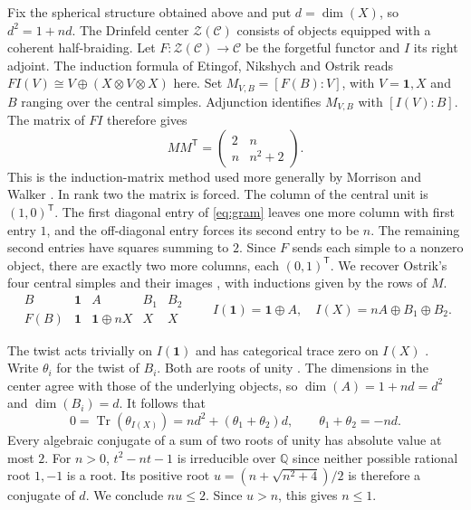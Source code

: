 \documentclass[11pt,a4paper]{article}
\newcommand{\Q}{\mathbb Q}
\newcommand{\one}{\mathbf 1}
\newcommand{\cC}{\mathcal C}
\newcommand{\cZ}{\mathcal Z}
\DeclareMathOperator{\Tr}{Tr}
\numberwithin{equation}{section}
\begin{document}
Fix the spherical structure obtained above and put $d=\dim(X)$, so
$d^2=1+nd$. The Drinfeld center $\cZ(\cC)$ consists of objects
equipped with a coherent half-braiding. Let $F:\cZ(\cC)\to\cC$ be
the forgetful functor and $I$ its right adjoint. The induction formula
of Etingof, Nikshych and Ostrik \cite[Proposition~5.4]{ENO} reads
$FI(V)\cong V\oplus(X\otimes V\otimes X)$ here. Set
$M_{V,B}=[F(B):V]$, with $V=\one,X$ and $B$ ranging over the
central simples. Adjunction identifies $M_{V,B}$ with $[I(V):B]$.
The matrix of $FI$ therefore gives
\begin{equation}\label{eq:gram}
 M M^{\mathsf T}=
 \begin{pmatrix}2&n\\ n&n^2+2\end{pmatrix}.
\end{equation}
This is the induction-matrix method used more generally by Morrison
and Walker \cite{MW}. In rank two the matrix is forced. The column of
the central unit is $(1,0)^{\mathsf T}$. The first diagonal entry of
\eqref{eq:gram} leaves one more column with first entry $1$, and the
off-diagonal entry forces its second entry to be $n$. The remaining
second entries have squares summing to $2$. Since $F$ sends each
simple to a nonzero object, there are exactly two more columns, each
$(0,1)^{\mathsf T}$. We recover Ostrik's four central simples and their images
\cite[Lemma~2.1]{OstrikRank2}, with inductions given by the rows of $M$.
\[
\begin{array}{c|cccc}
 B&\one&A&B_1&B_2\\ \hline
 F(B)&\one&\one\oplus nX&X&X
\end{array}
\qquad
 I(\one)=\one\oplus A,\quad I(X)=nA\oplus B_1\oplus B_2 .
\]

The twist acts trivially on $I(\one)$ and has categorical trace zero
on $I(X)$ \cite[Theorem~2.5]{OstrikRank3}. Write $\theta_i$ for the
twist of $B_i$. Both are roots of unity
\cite[Theorem~5.5]{NS}. The dimensions in the center agree with
those of the underlying objects, so $\dim(A)=1+nd=d^2$ and
$\dim(B_i)=d$. It follows that
\[
 0=\Tr(\theta_{I(X)})=nd^2+(\theta_1+\theta_2)d,\qquad
 \theta_1+\theta_2=-nd .
\]
Every algebraic conjugate of a sum of two roots of unity has
absolute value at most $2$. For $n>0$, $t^2-nt-1$ is irreducible
over $\Q$ since neither possible rational root $1,-1$ is a root.
Its positive root $u=(n+\sqrt{n^2+4})/2$ is therefore a conjugate of
$d$. We conclude $nu\leq2$. Since $u>n$, this gives $n\leq1$.
\end{document}
